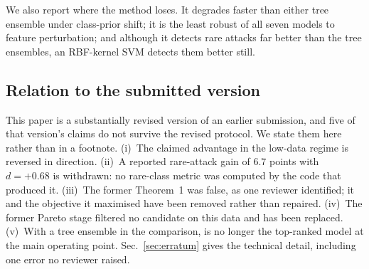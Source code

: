 \begin{revbody}
We also report where the method loses. It degrades faster than either tree
ensemble under class-prior shift; it is the least robust of all seven models to
feature perturbation; and although it detects rare attacks far better than the
tree ensembles, an RBF-kernel SVM detects them better still.
\end{revbody}

\subsection*{Relation to the submitted version}
\begin{revbody}

This paper is a substantially revised version of an earlier submission, and five
of that version's claims do not survive the revised protocol. We state them
here rather than in a footnote. (i)~The claimed advantage in the low-data regime
is reversed in direction. (ii)~A reported rare-attack gain of $6.7$ points with
$d=+0.68$ is withdrawn: no rare-class metric was computed by the code that
produced it. (iii)~The former Theorem~1 was false, as one reviewer identified;
it and the objective it maximised have been removed rather than repaired.
(iv)~The former Pareto stage filtered no candidate on this data and has been
replaced. (v)~With a tree ensemble in the comparison, \QSVM{} is no longer the
top-ranked model at the main operating point. Sec.~\ref{sec:erratum} gives the
technical detail, including one error no reviewer raised.
\end{revbody}
